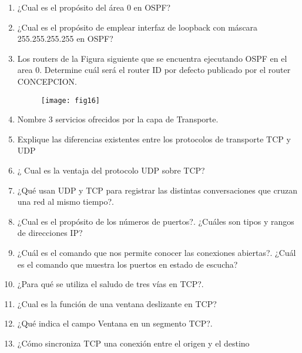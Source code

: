 \documentclass{udparticle}
\begin{document}
\begin{enumerate}
\item ¿Cual es el propósito del área 0 en OSPF?
\item ¿Cual es el propósito de emplear interfaz de loopback con máscara
255.255.255.255 en OSPF?
\item Los routers de la Figura siguiente que  se encuentra ejecutando OSPF en el 
area 0. 
Determine cuál será el router ID por defecto publicado por el router 
CONCEPCION.
	\begin{figure}[H]
	\centering
	\texttt{[image: fig16]}
	\end{figure}
\item Nombre 3 servicios ofrecidos por la capa de Transporte.
\item Explique las diferencias existentes entre los protocolos de 
transporte TCP y UDP
\item ¿ Cual es la ventaja del protocolo UDP sobre TCP?
\item ¿Qué usan UDP y TCP para registrar las distintas conversaciones 
que cruzan una red al mismo tiempo?.
\item ¿Cual es el propósito de los números de puertos?. ¿Cuáles son 
tipos y rangos de direcciones IP?
\item ¿Cuál es el comando que nos permite conocer las conexiones 
abiertas?. 
¿Cuál es el comando que muestra los puertos en estado de escucha?
\item ¿Para qué se utiliza el saludo de tres vías en TCP?.
\item ¿Cual es la función de una ventana deslizante en TCP?
\item ¿Qué indica el campo Ventana en un segmento TCP?.
\item ¿Cómo sincroniza TCP una conexión entre el origen y el destino 


\end{enumerate}
\end{document}
